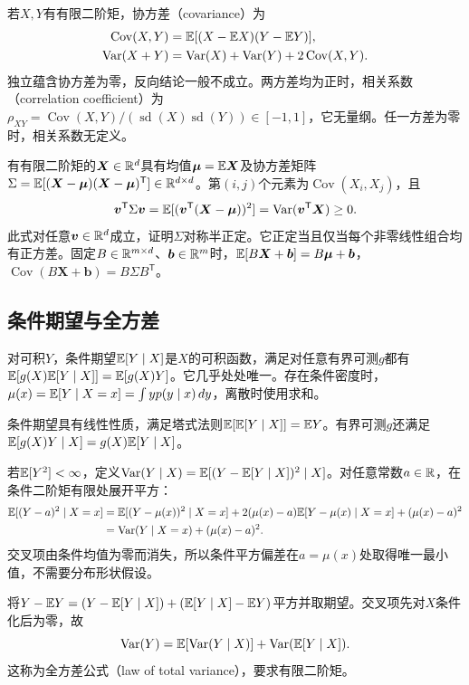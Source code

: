 若$X,Y$有有限二阶矩，协方差（covariance）为
\begin{align}
 \operatorname{Cov}(X,Y)&=\mathbb{E}[(X-\mathbb{E} X)(Y-\mathbb{E} Y)],\\
 \operatorname{Var}(X+Y)&=\operatorname{Var}(X)+\operatorname{Var}(Y)+2\operatorname{Cov}(X,Y).
\end{align}
独立蕴含协方差为零，反向结论一般不成立。两方差均为正时，相关系数（correlation coefficient）为$\rho_{XY}=\operatorname{Cov}(X,Y)/(\operatorname{sd}(X)\operatorname{sd}(Y))\in[-1,1]$，它无量纲。任一方差为零时，相关系数无定义。

有有限二阶矩的$\bm X\in\mathbb{R}^d$具有均值$\bm\mu=\mathbb{E}\bm X$及协方差矩阵$\Sigma=\mathbb{E}[(\bm X-\bm\mu)(\bm X-\bm\mu)^{\mathsf T}]\in\mathbb{R}^{d\times d}$。第$(i,j)$个元素为$\operatorname{Cov}(X_i,X_j)$，且
\begin{equation}
 \bm v^{\mathsf T}\Sigma\bm v=\mathbb{E}[(\bm v^{\mathsf T}(\bm X-\bm\mu))^2]
 =\operatorname{Var}(\bm v^{\mathsf T}\bm X)\geq0.
 \label{eq:math-covariance-psd}
\end{equation}
此式对任意$\bm v\in\mathbb{R}^d$成立，证明$\Sigma$对称半正定。它正定当且仅当每个非零线性组合均有正方差。固定$B\in\mathbb{R}^{m\times d}$、$\bm b\in\mathbb{R}^m$时，$\mathbb{E}[B\bm X+\bm b]=B\bm\mu+\bm b$，$\operatorname{Cov}(B\bm X+\bm b)=B\Sigma B^{\mathsf T}$。

\subsection{条件期望与全方差}
对可积$Y$，条件期望$\mathbb{E}[Y\mid X]$是$X$的可积函数，满足对任意有界可测$g$都有$\mathbb{E}[g(X)\mathbb{E}[Y\mid X]]=\mathbb{E}[g(X)Y]$。它几乎处处唯一。存在条件密度时，$\mu(x)=\mathbb{E}[Y\mid X=x]=\int yp(y\mid x)\,dy$，离散时使用求和。

条件期望具有线性性质，满足塔式法则$\mathbb{E}[\mathbb{E}[Y\mid X]]=\mathbb{E} Y$。有界可测$g$还满足$\mathbb{E}[g(X)Y\mid X]=g(X)\mathbb{E}[Y\mid X]$。

若$\mathbb{E}[Y^2]<\infty$，定义$\operatorname{Var}(Y\mid X)=\mathbb{E}[(Y-\mathbb{E}[Y\mid X])^2\mid X]$。对任意常数$a\in\mathbb{R}$，在条件二阶矩有限处展开平方：
\begin{align}
 \mathbb{E}[(Y-a)^2\mid X=x]
 &=\mathbb{E}[(Y-\mu(x))^2\mid X=x]
 +2(\mu(x)-a)\mathbb{E}[Y-\mu(x)\mid X=x]+(\mu(x)-a)^2\\
 &=\operatorname{Var}(Y\mid X=x)+(\mu(x)-a)^2.
 \label{eq:math-conditional-mse}
\end{align}
交叉项由条件均值为零而消失，所以条件平方偏差在$a=\mu(x)$处取得唯一最小值，不需要分布形状假设。

将$Y-\mathbb{E} Y=(Y-\mathbb{E}[Y\mid X])+(\mathbb{E}[Y\mid X]-\mathbb{E} Y)$平方并取期望。交叉项先对$X$条件化后为零，故
\begin{equation}
 \operatorname{Var}(Y)=\mathbb{E}[\operatorname{Var}(Y\mid X)]+\operatorname{Var}(\mathbb{E}[Y\mid X]).
 \label{eq:math-total-variance}
\end{equation}
这称为全方差公式（law of total variance），要求有限二阶矩。

